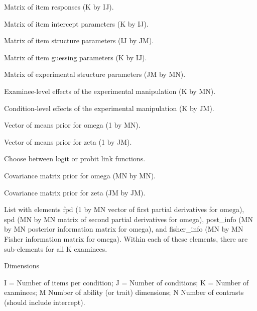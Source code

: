 \documentclass[a4paper]{book}
\begin{document}
\begin{Arguments}
\begin{ldescription}
\item[\code{y}] Matrix of item responses (K by IJ).

\item[\code{nu}] Matrix of item intercept parameters (K by IJ).

\item[\code{lambda}] Matrix of item structure parameters (IJ by JM).

\item[\code{kappa}] Matrix of item guessing parameters (K by IJ).

\item[\code{gamma}] Matrix of experimental structure parameters (JM by MN).

\item[\code{omega}] Examinee-level effects of the experimental manipulation (K by
MN).

\item[\code{zeta}] Condition-level effects of the experimental manipulation (K by
JM).

\item[\code{omega\_mu}] Vector of means prior for omega (1 by MN).

\item[\code{zeta\_mu}] Vector of means prior for zeta (1 by JM).

\item[\code{link}] Choose between logit or probit link functions.

\item[\code{omega\_sigma@}] Covariance matrix prior for omega (MN by MN).

\item[\code{zeta\_sigma@}] Covariance matrix prior for zeta (JM by JM).
\end{ldescription}
\end{Arguments}
%
\begin{Value}
List with elements fpd (1 by MN vector of first partial derivatives
for omega), spd (MN by MN matrix of second partial derivatives for omega),
post\_info (MN by MN posterior information matrix for omega), and fisher\_info
(MN by MN Fisher information matrix for omega). Within each of these
elements, there are sub-elements for all K examinees.
\end{Value}
%
\begin{Section}{Dimensions}

I = Number of items per condition; J = Number of conditions; K = Number of
examinees; M Number of ability (or trait) dimensions; N Number of contrasts
(should include intercept).
\end{Section}
\end{document}
